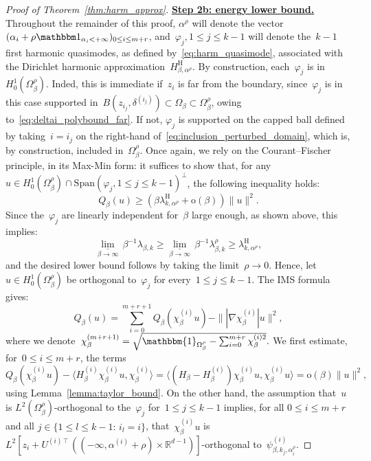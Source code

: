 \documentclass[10pt]{article}
\newcommand{\R}{\mathbb{R}}
\newcommand{\1}{\mathbbm 1}
\newcommand{\deltaRadius}[1]{\delta^{(#1)}} %
\newcommand{\epsLimit}[1]{\alpha^{(#1)}} %
\newcommand{\hessPassage}[2][]{U^{(#2)#1}} %
\newcommand{\shift}{\rho} %
\renewcommand{\o}{\mathrm{o}}
\begin{document}
\begin{proof}[Proof of Theorem~\ref{thm:harm_approx}]
        {\underline{\bf Step 2b: energy lower bound.}\newline}
        Throughout the remainder of this proof, $\alpha^\shift$ will denote the vector~$(\alpha_i+\shift\1_{\alpha_i<+\infty})_{0\leq i\leq m+r}$, and~$\varphi_{j}, 1\leq j \leq k-1$ will denote the~$k-1$ first harmonic quasimodes, as defined by~\eqref{eq:harm_quasimode}, associated with the Dirichlet harmonic approximation~$H^{\mathrm{H}}_{\beta,\alpha^\shift}$. By construction, each~$\varphi_j$ is in~$H_0^1(\Omega_\beta^\shift)$. Inded, this is immediate if~$z_i$ is far from the boundary, since~$\varphi_j$ is in this case supported in~$B(z_{i_j},\deltaRadius{i_j}) \subset \Omega_\beta \subset\Omega_\beta^\shift$, owing to~\eqref{eq:deltai_polybound_far}.
        If not, $\varphi_j$ is supported on the capped ball defined by taking~$i=i_j$ on the right-hand of~\eqref{eq:inclusion_perturbed_domain}, which is, by construction, included in~$\Omega_\beta^\shift$.
        Once again, we rely on the Courant--Fischer principle, in its Max-Min form: it suffices to show that, for any~$u \in H_0^1(\Omega_\beta^\shift)\cap\mathrm{Span}(\varphi_j, 1\leq j \leq k-1)^\perp$, the following inequality holds:
       ~$$ Q_\beta(u) \geq (\beta\lambda_{k,\alpha^\shift}^{\mathrm{H}} + \o(\beta))\|u\|^2.$$
        Since the~$\varphi_j$ are linearly independent for~$\beta$ large enough, as shown above, this implies:
        \[\underset{\beta\to\infty}{\underline\lim}\,\beta^{-1}\lambda_{\beta,k}\geq\underset{\beta\to\infty}{\underline\lim}\,\beta^{-1}\lambda^\shift_{\beta,k}\geq \lambda_{k,\alpha^\shift}^{\mathrm{H}},\]
        and the desired lower bound follows by taking the limit~$\shift\to 0$.
        Hence, let~$u\in H_0^1(\Omega_\beta^\shift)$ be orthogonal to~$\varphi_j$ for every~$1\leq j \leq k-1$. The IMS formula gives:
        \[Q_\beta(u) = \sum_{i=0}^{m+r+1} Q_\beta(\chi_\beta^{(i)}u) - \||\nabla \chi_\beta^{(i)}|u\|^2,\]
        where we denote~$\chi_\beta^{(m+r+1)} = \sqrt{\mathbbm{1}_{\Omega_\beta^\shift}-\sum_{i=0}^{m+r}\chi_\beta^{(i)2}}.$
        We first estimate, for~$0\leq i \leq m+r$, the terms
        \begin{equation}
            Q_\beta(\chi_\beta^{(i)}u)-\langle H_\beta^{(i)}\chi_\beta^{(i)}u,\chi_\beta^{(i)}\rangle = \langle (H_\beta-H_\beta^{(i)})\chi_\beta^{(i)}u,\chi_\beta^{(i)}u\rangle = \mathrm o(\beta)\|u\|^2,
        \end{equation}
        using Lemma~\ref{lemma:taylor_bound}.
        On the other hand, the assumption that~$u$ is $L^2(\Omega_\beta^\shift)$-orthogonal to the~$\varphi_j$ for~$1\leq j \leq k-1$ implies, for all $0\leq i\leq m+r$ and all $j \in \{1\leq l\leq k-1:\,i_l =i \}$, that~$\chi_\beta^{(i)}u$ is $L^2\left[z_{i} + \hessPassage[\intercal]{i} \left((-\infty,\epsLimit{i}+\shift)\times\R^{d-1}\right)\right]$-orthogonal to~$\psi_{\beta,k_j,\alpha_{i}^\shift}^{(i)}$.

\end{proof}
\end{document}
